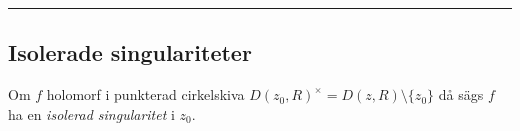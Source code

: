\noindent\rule{\linewidth}{0.4pt}

\subsection{Isolerade singulariteter}
\begin{definition}
Om $f$ holomorf i punkterad cirkelskiva $D(z_0, R)^\times = D(z, R) \setminus \{z_0\}$ då sägs $f$ ha en \emph{isolerad singularitet} i $z_0$.
\end{definition}
